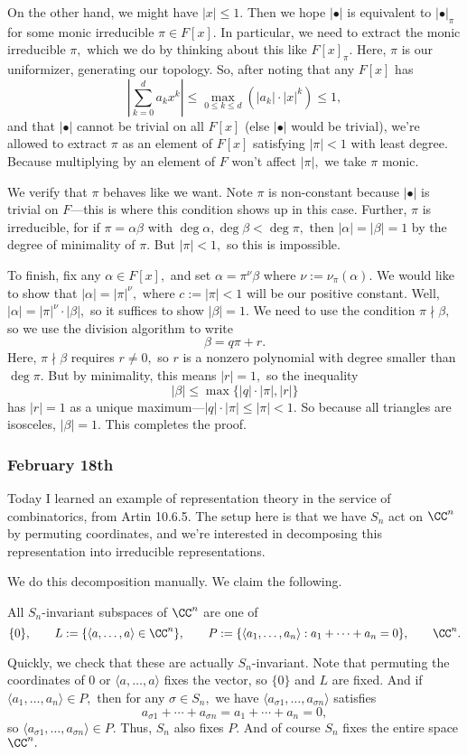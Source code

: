 On the other hand, we might have $|x|\le1.$ Then we hope $|\bullet|$ is equivalent to $|\bullet|_\pi$ for some monic irreducible $\pi\in F[x].$ In particular, we need to extract the monic irreducible $\pi,$ which we do by thinking about this like $F[x]_\pi.$ Here, $\pi$ is our uniformizer, generating our topology. So, after noting that any $F[x]$ has
\[\left|\sum_{k=0}^da_kx^k\right|\le\max_{0\le k\le d}\left(|a_k|\cdot|x|^k\right)\le1,\]
and that $|\bullet|$ cannot be trivial on all $F[x]$ (else $|\bullet|$ would be trivial), we're allowed to extract $\pi$ as an element of $F[x]$ satisfying $|\pi|<1$ with least degree. Because multiplying by an element of $F$ won't affect $|\pi|,$ we take $\pi$ monic.

We verify that $\pi$ behaves like we want. Note $\pi$ is non-constant because $|\bullet|$ is trivial on $F$---this is where this condition shows up in this case. Further, $\pi$ is irreducible, for if $\pi=\alpha\beta$ with $\deg\alpha,\deg\beta<\deg\pi,$ then $|\alpha|=|\beta|=1$ by the degree of minimality of $\pi.$ But $|\pi|<1,$ so this is impossible.

To finish, fix any $\alpha\in F[x],$ and set $\alpha=\pi^\nu\beta$ where $\nu:=\nu_\pi(\alpha).$ We would like to show that $|\alpha|=|\pi|^\nu,$ where $c:=|\pi|<1$ will be our positive constant. Well, $|\alpha|=|\pi|^\nu\cdot|\beta|,$ so it suffices to show $|\beta|=1.$ We need to use the condition $\pi\nmid\beta,$ so we use the division algorithm to write
\[\beta=q\pi+r.\]
Here, $\pi\nmid\beta$ requires $r\ne0,$ so $r$ is a nonzero polynomial with degree smaller than $\deg\pi.$ But by minimality, this means $|r|=1,$ so the inequality
\[|\beta|\le\max\{|q|\cdot|\pi|,|r|\}\]
has $|r|=1$ as a unique maximum---$|q|\cdot|\pi|\le|\pi|<1.$ So because all triangles are isosceles, $|\beta|=1.$ This completes the proof.

\subsubsection{February 18th}
Today I learned an example of representation theory in the service of combinatorics, from Artin 10.6.5. The setup here is that we have $S_n$ act on $\CC^n$ by permuting coordinates, and we're interested in decomposing this representation into irreducible representations.

We do this decomposition manually. We claim the following.
\begin{proposition}
    All $S_n$-invariant subspaces of $\CC^n$ are one of
    \[\{0\},\qquad L:=\{\langle a,\ldots,a\rangle\in\CC^n\},\qquad P:=\{\langle a_1,\ldots,a_n\rangle:a_1+\cdots+a_n=0\},\qquad\CC^n.\]
\end{proposition}
Quickly, we check that these are actually $S_n$-invariant. Note that permuting the coordinates of $0$ or $\langle a,\ldots,a\rangle$ fixes the vector, so $\{0\}$ and $L$ are fixed. And if $\langle a_1,\ldots,a_n\rangle\in P,$ then for any $\sigma\in S_n,$ we have $\langle a_{\sigma1},\ldots,a_{\sigma n}\rangle$ satisfies
\[a_{\sigma1}+\cdots+a_{\sigma n}=a_1+\cdots+a_n=0,\]
so $\langle a_{\sigma1},\ldots,a_{\sigma n}\rangle\in P.$ Thus, $S_n$ also fixes $P.$ And of course $S_n$ fixes the entire space $\CC^n.$

